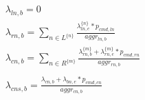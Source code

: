 \documentclass[11pt]{article}
\begin{document}
\begin{equation}
	\begin{array}{l}
		\lambda_{ln,b}=0 \\
		\lambda_{rn,b}=\sum\limits_{n \in L^{\{n\}}}\frac{\lambda_{ln,e}^{\{n\}}*p_{cmd,ln}}{aggr_{ln,b}}\\
		\lambda_{cn,b}=\sum\limits_{n \in R^{\{m\}}}\frac{\lambda_{rn,b}^{\{m\}}+\lambda_{rn,e}^{\{m\}}*p_{cmd,rn}}{aggr_{rn,b}}\\
		\\
		\lambda_{cns, b} = \frac{\lambda_{cn,b}+\lambda_{bn,e}*p_{cmd,cn}}{aggr_{cn,b}} \\
	\end{array}
\end{equation}
\end{document}
